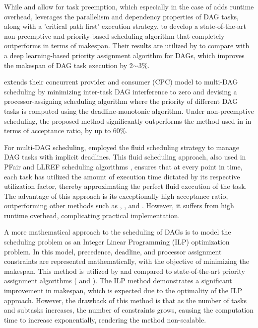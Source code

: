 While \cite{he2019intra} and \cite{CaoStretchingDAGs2020} allow 
for task preemption, which especially in the case of 
\cite{CaoStretchingDAGs2020} adds runtime overhead, 
\cite{zhao2020dag} leverages the parallelism and dependency 
properties of DAG tasks, along with a 'critical path first' 
execution strategy, to develop a state-of-the-art non-preemptive 
and priority-based scheduling algorithm that completely outperforms 
\cite{he2019intra} in terms of makespan. Their results are utilized 
by \cite{lee2021DAGDeeplearning} to compare with a deep 
learning-based priority assignment algorithm for DAGs, which 
improves the makespan of DAG task execution by 2$\sim$3\%.

\cite{zhao2022dag} extends their concurrent provider and consumer 
(CPC) model \cite{zhao2020dag} to multi-DAG scheduling by 
minimizing inter-task DAG interference to zero and devising a 
processor-assigning scheduling algorithm where the priority of 
different DAG tasks is computed using the deadline-monotonic 
algorithm. Under non-preemptive scheduling, the proposed method 
significantly outperforms the method used in \cite{he2019intra} in 
terms of acceptance ratio, by up to 60\%.

For multi-DAG scheduling, \cite{GuanDAGfluid2021} employed the 
fluid scheduling strategy to manage DAG tasks with implicit 
deadlines. This fluid scheduling approach, also used in PFair and 
LLREF scheduling algorithms \cite{baruah1993PFair}\cite{cho2006LLREF}, 
ensures that at every point in time, each task has utilized the 
amount of execution time dictated by its respective utilization 
factor, thereby approximating the perfect fluid execution of the 
task. The advantage of this approach is its exceptionally high 
acceptance ratio, outperforming other methods such as 
\cite{WangGEDFDag2019}, \cite{he2019intra}, and \cite{CaoStretchingDAGs2020}. 
However, it suffers from high runtime overhead, complicating 
practical implementation.
\newline

A more mathematical approach to the scheduling of DAGs is to model 
the scheduling problem as an Integer Linear Programming (ILP) 
optimization problem. In this model, precedence, deadline, and 
processor assignment constraints are represented mathematically, 
with the objective of minimizing the makespan. This method is 
utilized by \cite{ChangMinWRCTBoundILP2022} and compared to 
state-of-the-art priority assignment algorithms (\cite{he2019intra} 
and \cite{zhao2020dag}). The ILP method demonstrates a significant 
improvement in makespan, which is expected due to the optimality of 
the ILP approach. However, the drawback of this method is that as 
the number of tasks and subtasks increases, the number of 
constraints grows, causing the computation time to increase 
exponentially, rendering the method non-scalable.

